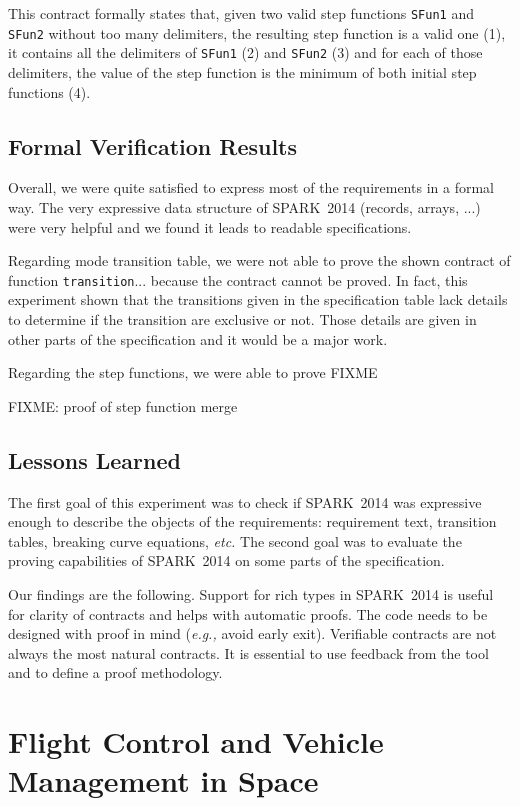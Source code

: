 \documentclass[10pt,a4paper,twocolumn]{article}
\newcommand{\newspark}{SPARK~2014\xspace}
\newcommand{\etc}{\textit{etc.}\xspace}
\newcommand{\eg}{\textit{e.g.,}\xspace}
\newcommand{\SPARK}[1]{\lstinline[language=Ada,basicstyle={\footnotesize
      \sffamily},framesep=0pt]$#1$}
\begin{document}
This contract formally states that, given two valid step functions
\SPARK{SFun1} and \SPARK{SFun2} without too many delimiters, the
resulting step function is a valid one (1), it contains all the
delimiters of \SPARK{SFun1} (2) and \SPARK{SFun2} (3) and for each of
those delimiters, the value of the step function is the minimum of
both initial step functions (4).


\subsection{Formal Verification Results}

Overall, we were quite satisfied to express most of the requirements
in a formal way. The very expressive data structure of \newspark
(records, arrays, ...) were very helpful and we found it leads to
readable specifications.

Regarding mode transition table, we were not able to prove the shown
contract of function \SPARK{transition}... because the contract cannot
be proved. In fact, this experiment shown that the transitions given
in the specification table lack details to determine if the transition
are exclusive or not. Those details are given in other parts of the
specification and it would be a major work.

Regarding the step functions, we were able to prove FIXME

FIXME: proof of step function merge

\subsection{Lessons Learned}

The first goal of this experiment was to check if \newspark was expressive
enough to describe the objects of the requirements: requirement text,
transition tables, breaking curve equations, \etc The second goal was to
evaluate the proving capabilities of \newspark on some parts of the
specification.

Our findings are the following. Support for rich types in \newspark is useful
for clarity of contracts and helps with automatic proofs. The code needs to be
designed with proof in mind (\eg avoid early exit). Verifiable contracts are
not always the most natural contracts. It is essential to use feedback from the
tool and to define a proof methodology.

\section{Flight Control and Vehicle Management in Space}
\end{document}
